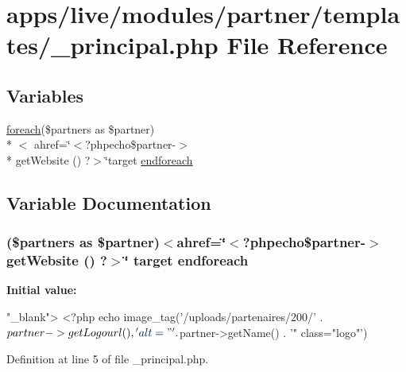 \hypertarget{__principal_8php}{\section{apps/live/modules/partner/templates/\-\_\-principal.php File Reference}
\label{__principal_8php}
}
\subsection*{Variables}
\begin{DoxyCompactItemize}
\item 
\hyperlink{presse_2modules_2news_2templates_2index_success_8php_abc56db52b2e9a59bcd5c9e45ac5cb332}{foreach}(\$partners as \$partner)\\*
$<$ ahref=\char`\"{}$<$?phpecho\$partner-\/$>$\\*
 get\-Website () ?$>$\char`\"{}target \hyperlink{__principal_8php_a65ae895a491839589caa44bda20405fa}{endforeach}
\end{DoxyCompactItemize}


\subsection{Variable Documentation}
\hypertarget{__principal_8php_a65ae895a491839589caa44bda20405fa}{
\subsubsection[{endforeach}]{ (\$partners as \$partner)$<$ahref=\char`\"{}$<$?phpecho\$partner-\/$>$ get\-Website () ?$>$\char`\"{} target endforeach}}\label{__principal_8php_a65ae895a491839589caa44bda20405fa}
{\bfseries Initial value\-:}
\begin{DoxyCode}
\textcolor{stringliteral}{"\_blank"}>
                <?php echo  image\_tag(\textcolor{stringliteral}{'/uploads/partenaires/200/'} . $partner->
      getLogourl(), \textcolor{stringliteral}{'alt="'} . $partner->getName() . \textcolor{stringliteral}{'" class="logo"'})
\end{DoxyCode}


Definition at line 5 of file \-\_\-principal.\-php.

